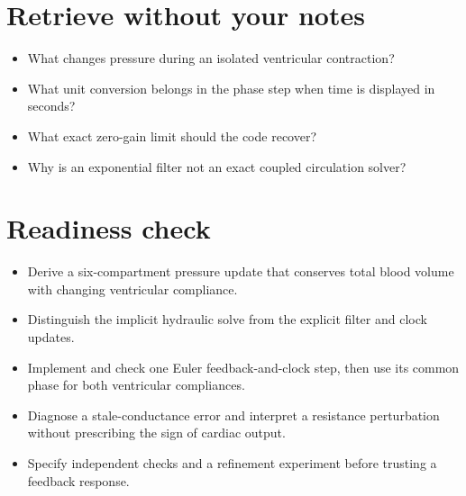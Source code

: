\documentclass[11pt,letterpaper]{article}
\theoremstyle{definition}\newtheorem{definition}{Definition}\newtheorem{example}{Example}
\numberwithin{equation}{section}
\begin{document}
\section*{Retrieve without your notes}
\begin{itemize}
\item What changes pressure during an isolated ventricular contraction?
\item What unit conversion belongs in the phase step when time is displayed in seconds?
\item What exact zero-gain limit should the code recover?
\item Why is an exponential filter not an exact coupled circulation solver?
\end{itemize}
\section*{Readiness check}
\begin{itemize}
\item Derive a six-compartment pressure update that conserves total blood volume with changing ventricular compliance.
\item Distinguish the implicit hydraulic solve from the explicit filter and clock updates.
\item Implement and check one Euler feedback-and-clock step, then use its common phase for both ventricular compliances.
\item Diagnose a stale-conductance error and interpret a resistance perturbation without prescribing the sign of cardiac output.
\item Specify independent checks and a refinement experiment before trusting a feedback response.
\end{itemize}
\end{document}
